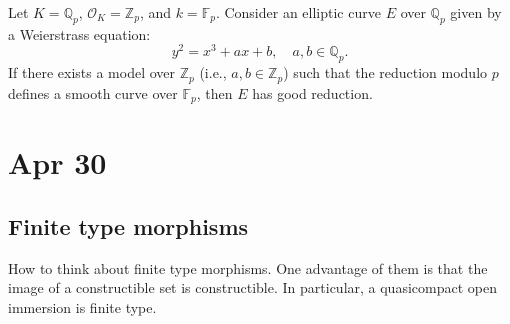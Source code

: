 \documentclass[12pt]{article}
\begin{document}
\begin{example}
    Let \( K = \mathbb{Q}_p \), \( \mathcal{O}_K = \mathbb{Z}_p \), and \( k = \mathbb{F}_p \). Consider an elliptic curve \( E \) over \( \mathbb{Q}_p \) given by a Weierstrass equation:
    \[
    y^2 = x^3 + ax + b, \quad a, b \in \mathbb{Q}_p.
    \]
    If there exists a model over \( \mathbb{Z}_p \) (i.e., \( a, b \in \mathbb{Z}_p \)) such that the reduction modulo \( p \) defines a smooth curve over \( \mathbb{F}_p \), then \( E \) has good reduction.
\end{example}

\section{Apr 30}
\subsection{Finite type morphisms}
How to think about finite type morphisms. One advantage of them is that the image of a constructible set is constructible. In particular, a quasicompact open immersion is finite type.
\end{document}
